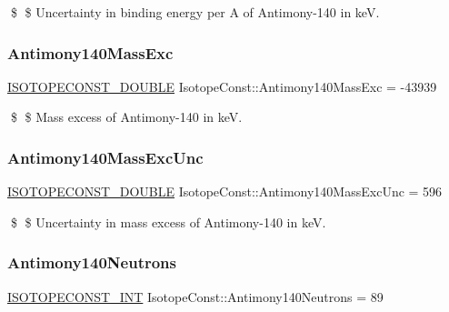 \$ \$ Uncertainty in binding energy per A of Antimony-\/140 in keV. \mbox{\label{group___isotope_const-_antimony-_sb140_gae47f4aeb0a2be1409ffa4ee7543590b0}} 
\subsubsection{\texorpdfstring{Antimony140\+Mass\+Exc}{Antimony140MassExc}}
{\footnotesize\ttfamily \mbox{\hyperlink{group___isotope_const-_macros_ga8f45a7272ce02c0b4c65c44636ed719a}{I\+S\+O\+T\+O\+P\+E\+C\+O\+N\+S\+T\+\_\+\+D\+O\+U\+B\+LE}} Isotope\+Const\+::\+Antimony140\+Mass\+Exc = -\/43939}

\$ \$ Mass excess of Antimony-\/140 in keV. \mbox{\label{group___isotope_const-_antimony-_sb140_ga0e5dfb3821f4b246fb747e6968bbf7f0}} 
\subsubsection{\texorpdfstring{Antimony140\+Mass\+Exc\+Unc}{Antimony140MassExcUnc}}
{\footnotesize\ttfamily \mbox{\hyperlink{group___isotope_const-_macros_ga8f45a7272ce02c0b4c65c44636ed719a}{I\+S\+O\+T\+O\+P\+E\+C\+O\+N\+S\+T\+\_\+\+D\+O\+U\+B\+LE}} Isotope\+Const\+::\+Antimony140\+Mass\+Exc\+Unc = 596}

\$ \$ Uncertainty in mass excess of Antimony-\/140 in keV. \mbox{\label{group___isotope_const-_antimony-_sb140_ga960b96d844d2710b6556e036cd750813}} 
\subsubsection{\texorpdfstring{Antimony140\+Neutrons}{Antimony140Neutrons}}
{\footnotesize\ttfamily \mbox{\hyperlink{group___isotope_const-_macros_ga5f18360b3e99483a35c32d789e62621c}{I\+S\+O\+T\+O\+P\+E\+C\+O\+N\+S\+T\+\_\+\+I\+NT}} Isotope\+Const\+::\+Antimony140\+Neutrons = 89}

